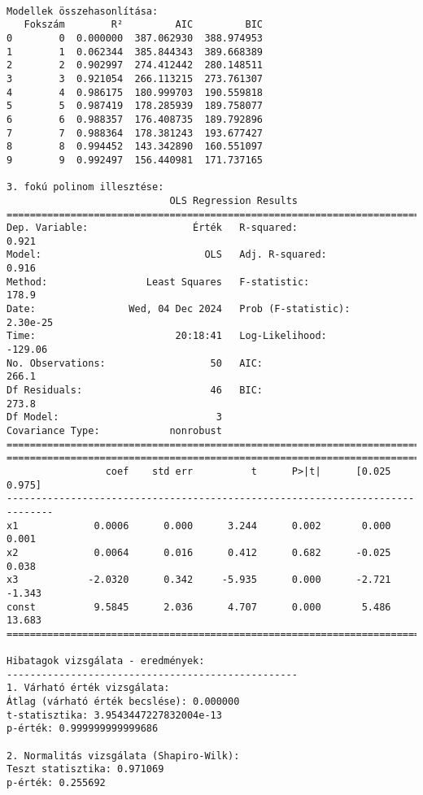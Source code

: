 \documentclass[11pt]{article}
\begin{document}
    \begin{Verbatim}[commandchars=\\\{\}]

Modellek összehasonlítása:
   Fokszám        R²         AIC         BIC
0        0  0.000000  387.062930  388.974953
1        1  0.062344  385.844343  389.668389
2        2  0.902997  274.412442  280.148511
3        3  0.921054  266.113215  273.761307
4        4  0.986175  180.999703  190.559818
5        5  0.987419  178.285939  189.758077
6        6  0.988357  176.408735  189.792896
7        7  0.988364  178.381243  193.677427
8        8  0.994452  143.342890  160.551097
9        9  0.992497  156.440981  171.737165

3. fokú polinom illesztése:
                            OLS Regression Results
==============================================================================
Dep. Variable:                  Érték   R-squared:                       0.921
Model:                            OLS   Adj. R-squared:                  0.916
Method:                 Least Squares   F-statistic:                     178.9
Date:                Wed, 04 Dec 2024   Prob (F-statistic):           2.30e-25
Time:                        20:18:41   Log-Likelihood:                -129.06
No. Observations:                  50   AIC:                             266.1
Df Residuals:                      46   BIC:                             273.8
Df Model:                           3
Covariance Type:            nonrobust
==============================================================================
==============================================================================
                 coef    std err          t      P>|t|      [0.025      0.975]
------------------------------------------------------------------------------
x1             0.0006      0.000      3.244      0.002       0.000       0.001
x2             0.0064      0.016      0.412      0.682      -0.025       0.038
x3            -2.0320      0.342     -5.935      0.000      -2.721      -1.343
const          9.5845      2.036      4.707      0.000       5.486      13.683
==============================================================================

Hibatagok vizsgálata - eredmények:
--------------------------------------------------
1. Várható érték vizsgálata:
Átlag (várható érték becslése): 0.000000
t-statisztika: 3.9543447227832004e-13
p-érték: 0.999999999999686

2. Normalitás vizsgálata (Shapiro-Wilk):
Teszt statisztika: 0.971069
p-érték: 0.255692


\end{Verbatim}
\end{document}

